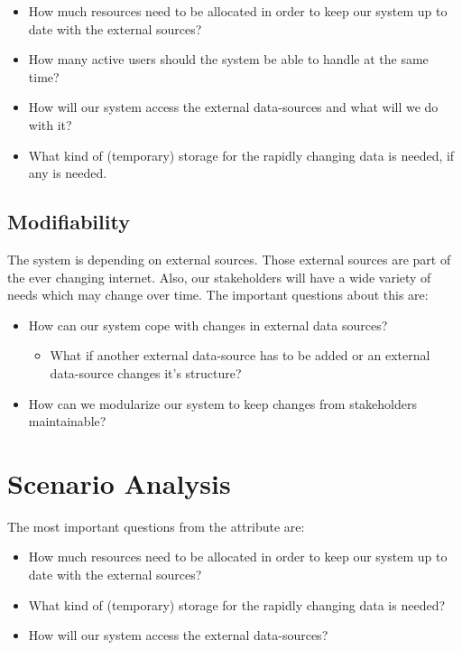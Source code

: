 \documentclass{article}
\begin{document}
\begin{itemize}
\item How much resources need to be allocated in order to keep our system up to date with the external sources?
\item How many active users should the system be able to handle at the same time?
\item How will our system access the external data-sources and what will we do with it?
\item What kind of (temporary) storage for the rapidly changing data is needed, if any is needed.
\end{itemize}

\subsection*{Modifiability}
The system is depending on external sources. Those external sources are part of the ever changing internet. Also, our stakeholders will have a wide variety of needs which may change over time. The important questions about this are:

\begin{itemize}
\item How can our system cope with changes in external data sources?  
\begin{itemize}
\item What if another external data-source has to be added or an external data-source changes it's structure?
\end{itemize}
\item How can we modularize our system to keep changes from stakeholders maintainable?
\end{itemize}

\section*{Scenario Analysis}

The most important questions from the attribute are: 
\begin{itemize}
\item How much resources need to be allocated in order to keep our system up to date with the external sources?
\item What kind of (temporary) storage for the rapidly changing data is needed?
\item How will our system access the external data-sources?
\end{itemize}
\end{document}
